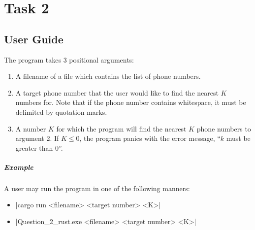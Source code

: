 \documentclass{report}
\begin{document}
\chapter{Task 2}

\section{User Guide}
The program takes 3 positional arguments:
\begin{enumerate}
	\item A filename of a file which contains the list of phone numbers.
	\item A target phone number that the user would like to find the nearest \(K\) numbers for. Note that if the phone number contains whitespace, it must be delimited by quotation marks.
	\item A number \(K\) for which the program will find the nearest \(K\) phone numbers to argument 2. If \(K \le 0\), the program panics with the error message, ``\(k\) must be greater than 0''.
\end{enumerate}
\paragraph{Example}
A user may run the program in one of the following manners:
\begin{itemize}
	\item |cargo run <filename> <target number> <K>|
	\item |Question_2_rust.exe <filename> <target number> <K>|
\end{itemize}
\end{document}
